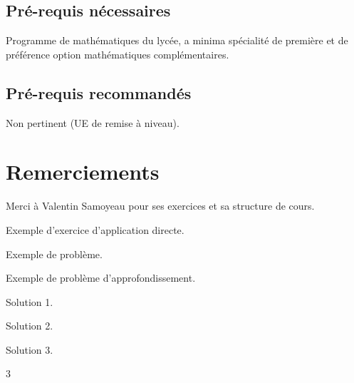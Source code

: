 \subsection*{Pré-requis nécessaires}

Programme de mathématiques du lycée, a minima spécialité de première et de préférence
option mathématiques complémentaires.

\subsection*{Pré-requis recommandés}

Non pertinent (UE de remise à niveau).

\section*{Remerciements}

Merci à Valentin Samoyeau pour ses exercices et sa structure de cours.

\begin{Exercise}[label=1, counter=preface]
	Exemple d'exercice d'application directe.
\end{Exercise}
\begin{Exercise}[difficulty=1, label=2, counter=preface]
	Exemple de problème.
\end{Exercise}
\begin{Exercise}[difficulty=2, label=3, counter=preface]
	Exemple de problème d'approfondissement.
\end{Exercise}
\shipoutExercise
\begin{Answer}[ref=1]
	Solution 1.
\end{Answer}
\begin{Answer}[ref=2]
	Solution 2.
\end{Answer}
\begin{Answer}[ref=3]
	Solution 3.
\end{Answer}
\begin{multicols}{3}
\shipoutAnswer
\end{multicols}

\patchcmd{\chapter}{\thispagestyle{plain}}{\thispagestyle{fancy}}{}{}

